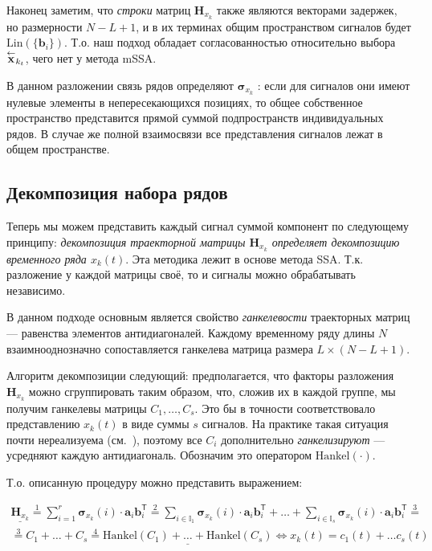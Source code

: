 	Наконец заметим, что \emph{строки} матриц $ \mathbf{H}_{x_k} $ также являются векторами задержек, но размерности $ N - L + 1 $, и в их терминах общим пространством сигналов будет $ \text{Lin}(\{\mathbf{b}_i\}) $. Т.о. наш подход обладает согласованностью относительно выбора $ \overset{\leftarrow}{\mathbf{x}}_{k_t} $, чего нет у метода mSSA.
	
	В данном разложении связь рядов определяют $ \boldsymbol{\sigma}_{x_k} $ : если для сигналов они имеют нулевые элементы в непересекающихся позициях, то общее собственное пространство представится прямой суммой подпространств индивидуальных рядов. В случае же полной взаимосвязи все представления сигналов лежат в общем пространстве.
	
	\subsection*{Декомпозиция набора рядов}\label{sec:decomposition}
	
	Теперь мы можем представить каждый сигнал суммой компонент по следующему принципу: \emph{декомпозиция траекторной матрицы $ \mathbf{H}_{x_k} $ определяет декомпозицию временного ряда $ x_k(t) $}. Эта методика лежит в основе метода SSA. Т.к. разложение у каждой матрицы своё, то и сигналы можно обрабатывать независимо.
	
	В данном подходе основным является свойство \emph{ганкелевости} траекторных матриц --- равенства элементов антидиагоналей. Каждому временному ряду длины $ N $ взаимнооднозначно сопоставляется ганкелева матрица размера $ L \times (N - L + 1) $.
	
	Алгоритм декомпозиции следующий: предполагается, что факторы разложения $ \mathbf{H}_{x_k} $ можно сгруппировать таким образом, что, сложив их в каждой группе, мы получим ганкелевы матрицы $ C_1, \ldots, C_s $. Это бы в точности соответствовало представлению $ x_k(t) $ в виде суммы $ s $ сигналов. На практике такая ситуация почти нереализуема (см.~\cite{ecfb9dc578be43ae9ee8fc88b8ff9151}), поэтому все $ C_i $ дополнительно \emph{ганкелизируют} --- усредняют каждую антидиагональ. Обозначим это оператором $ \text{Hankel}(\cdot) $. 
	
	Т.о. описанную процедуру можно представить выражением:
	
	\begin{multline}\label{eq:decomp_method_ideal}
		\underline{\mathbf{H}_{x_k}} \overset{1}{=} \sum\limits_{i = 1}^{r} \boldsymbol{\sigma}_{x_k}(i) \cdot \mathbf{a}_i  \mathbf{b}_i^{\mathsf{T}} \overset{2}{=} \sum\limits_{i \in \mathbb{I}_1} \boldsymbol{\sigma}_{x_k}(i) \cdot \mathbf{a}_i  \mathbf{b}_i^{\mathsf{T}} + \ldots + \sum\limits_{i \in \mathbb{I}_s} \boldsymbol{\sigma}_{x_k}(i) \cdot \mathbf{a}_i  \mathbf{b}_i^{\mathsf{T}} \overset{3}{=} \\ \overset{3}{=} C_1 + \ldots + C_s \overset{4}{=} \underline{\text{Hankel}(C_1) + \ldots + \text{Hankel}(C_s)}  \Leftrightarrow x_k(t) = c_1(t) + \ldots c_s(t)
	\end{multline}
	
